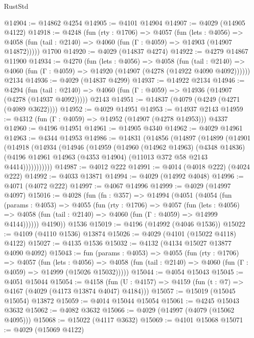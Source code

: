 \begin{lexlean}{RustStd}
\begin{coremodule}
@14904 := @14862 @4254
@14905 := @4101 @14904
@14907 := @4029 (@14905 @4122)
@14918 := @4248
    (fun (rty : @1706) =>
    @4057
      (fun (lets : @4056) =>
      @4058 (fun (tail : @2140) => @4060 (fun (Γ : @4059) => @14903 (@14907 @14872)))))
    @1700
@14920 := @4029 (@14837 @4274)
@14922 := @4279 @14867 @11900
@14934 := @4270
    (fun (lets : @4056) =>
    @4058
      (fun (tail : @2140) =>
      @4060 (fun (Γ : @4059) => @14920 (@14907 (@4278 (@14922 @4090 @4092))))))
    @2134
@14936 := @4029 (@14837 @4299)
@14937 := @14922 @2134
@14946 := @4294
    (fun (tail : @2140) => @4060 (fun (Γ : @4059) => @14936 (@14907 (@4278 (@14937 @4092)))))
    @2143
@14951 := @14837 (@4079 (@4249 (@4271 (@4089 @3622))))
@14952 := @4029 @14951
@14953 := @14937 @2143
@14959 := @4312 (fun (Γ : @4059) => @14952 (@14907 (@4278 @14953))) @4337
@14960 := @4196 @14951
@14961 := @14905 @4340
@14962 := @4029 @14961
@14963 := @4344 @14953
@14986 := @14831
    (@14856
      (@14897
        (@14899
          (@14901
            (@14918
              (@14934
                (@14946
                  (@14959
                    (@14960
                      (@14962 @14963)
                      (@4348 @14836)
                      (@4196 @14961 @14963 (@4353 @14904) (@11013 @372 @58 @2143 @4414)))))))))))
@14987 := @4012 @222
@14991 := @4014 (@4018 @222) (@4024 @222)
@14992 := @4033 @13871
@14994 := @4029 (@14992 @4048)
@14996 := @4071 (@4072 @222)
@14997 := @4067 @14996
@14999 := @4029 (@14997 @4097)
@15016 := @4028
    (fun (fn : @357) =>
    @14994
      (@4051
        (@4054
          (fun (params : @4053) =>
          @4055
            (fun (rty : @1706) =>
            @4057
              (fun (lets : @4056) =>
              @4058 (fun (tail : @2140) => @4060 (fun (Γ : @4059) => @14999 @4144))))))
        @4190))
    @1536
@15019 := @4196 (@14992 (@4046 @1536))
@15022 := @4109 (@4110 @1536) @13874
@15026 := @4029 (@4101 (@15022 @4118) @4122)
@15027 := @4135 @1536
@15032 := @4132 (@4134 @15027 @13877 @4090 @4092)
@15043 := fun (params : @4053) =>
  @4055
    (fun (rty : @1706) =>
    @4057
      (fun (lets : @4056) =>
      @4058 (fun (tail : @2140) => @4060 (fun (Γ : @4059) => @14999 (@15026 @15032)))))
@15044 := @4054 @15043
@15045 := @4051 @15044
@15054 := @4158
    (fun (U : @4157) => @4159 (fun (t : @7) => @4167 (@4029 (@4173 @13874 @4047) @4184)))
@15057 := @15019 (@15045 @15054) @13872
@15059 := @4014 @15044 @15054
@15061 := @4245 @15043 @3632
@15062 := @4082 @3632
@15066 := @4029 (@14997 (@4079 (@15062 @4095)))
@15068 := @15022 (@4117 @3632)
@15069 := @4101 @15068
@15071 := @4029 (@15069 @4122)

\end{coremodule}
\end{lexlean}
